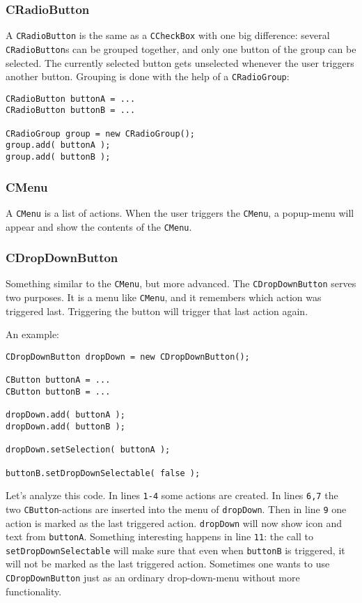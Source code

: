 \documentclass[a4paper,10pt]{article}
\newcommand{\src}[1]{\lstinline[basicstyle=\ttfamily]|#1|}
\begin{document}
\subsubsection{CRadioButton}
A \src{CRadioButton} is the same as a \src{CCheckBox} with one big difference: several \src{CRadioButton}s can be grouped together, and only one button of the group can be selected. The currently selected button gets unselected whenever the user triggers another button. Grouping is done with the help of a \src{CRadioGroup}:
\begin{lstlisting}
CRadioButton buttonA = ...
CRadioButton buttonB = ...

CRadioGroup group = new CRadioGroup();
group.add( buttonA );
group.add( buttonB );
\end{lstlisting}

\subsubsection{CMenu}
A \src{CMenu} is a list of actions. When the user triggers the \src{CMenu}, a popup-menu will appear and show the contents of the \src{CMenu}.

\subsubsection{CDropDownButton}
Something similar to the \src{CMenu}, but more advanced. The \src{CDropDownButton} serves two purposes. It is a menu like \src{CMenu}, and it remembers which action was triggered last. Triggering the button will trigger that last action again.

An example:
\begin{lstlisting}
CDropDownButton dropDown = new CDropDownButton();

CButton buttonA = ...
CButton buttonB = ...

dropDown.add( buttonA );
dropDown.add( buttonB );

dropDown.setSelection( buttonA );

buttonB.setDropDownSelectable( false );
\end{lstlisting}
Let's analyze this code. In lines \src{1-4} some actions are created. In lines \src{6,7} the two \src{CButton}-actions are inserted into the menu of \src{dropDown}. Then in line \src{9} one action is marked as the last triggered action. \src{dropDown} will now show icon and text from \src{buttonA}. Something interesting happens in line \src{11}: the call to \src{setDropDownSelectable} will make sure that even when \src{buttonB} is triggered, it will not be marked as the last triggered action. Sometimes one wants to use \src{CDropDownButton} just as an ordinary drop-down-menu without more functionality.
\end{document}
